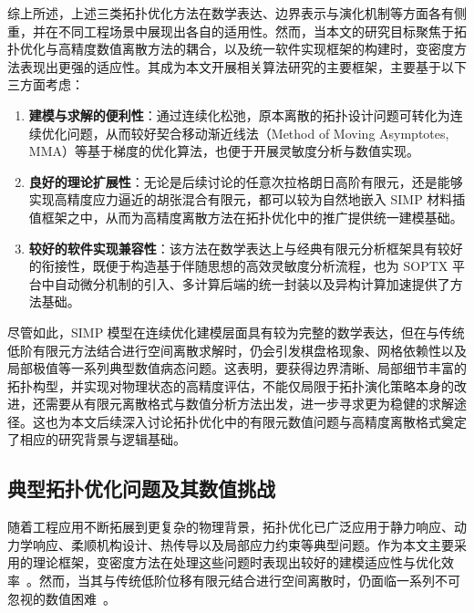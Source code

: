 综上所述，上述三类拓扑优化方法在数学表达、边界表示与演化机制等方面各有侧重，并在不同工程场景中展现出各自的适用性。然而，当本文的研究目标聚焦于拓扑优化与高精度数值离散方法的耦合，以及统一软件实现框架的构建时，变密度方法表现出更强的适应性。其成为本文开展相关算法研究的主要框架，主要基于以下三方面考虑：

\begin{enumerate}
	\item \textbf{建模与求解的便利性}：通过连续化松弛，原本离散的拓扑设计问题可转化为连续优化问题，从而较好契合移动渐近线法（Method of Moving Asymptotes, MMA）等基于梯度的优化算法，也便于开展灵敏度分析与数值实现。
	
	\item \textbf{良好的理论扩展性}：无论是后续讨论的任意次拉格朗日高阶有限元，还是能够实现高精度应力逼近的胡张混合有限元，都可以较为自然地嵌入 SIMP 材料插值框架之中，从而为高精度离散方法在拓扑优化中的推广提供统一建模基础。
	
	\item \textbf{较好的软件实现兼容性}：该方法在数学表达上与经典有限元分析框架具有较好的衔接性，既便于构造基于伴随思想的高效灵敏度分析流程，也为 SOPTX 平台中自动微分机制的引入、多计算后端的统一封装以及异构计算加速提供了方法基础。
\end{enumerate}

尽管如此，SIMP 模型在连续优化建模层面具有较为完整的数学表达，但在与传统低阶有限元方法结合进行空间离散求解时，仍会引发棋盘格现象、网格依赖性以及局部极值等一系列典型数值病态问题。这表明，要获得边界清晰、局部细节丰富的拓扑构型，并实现对物理状态的高精度评估，不能仅局限于拓扑演化策略本身的改进，还需要从有限元离散格式与数值分析方法出发，进一步寻求更为稳健的求解途径。这也为本文后续深入讨论拓扑优化中的有限元数值问题与高精度离散格式奠定了相应的研究背景与逻辑基础。


\subsection{典型拓扑优化问题及其数值挑战}
\label{subsec:top_problems_numerical_challenges}

随着工程应用不断拓展到更复杂的物理背景，拓扑优化已广泛应用于静力响应、动力学响应、柔顺机构设计、热传导以及局部应力约束等典型问题。作为本文主要采用的理论框架，变密度方法在处理这些问题时表现出较好的建模适应性与优化效率~\cite{sigmundTopologyOptimizationApproaches2013a}。然而，当其与传统低阶位移有限元结合进行空间离散时，仍面临一系列不可忽视的数值困难~\cite{sigmundNumericalInstabilitiesTopology1998}。

